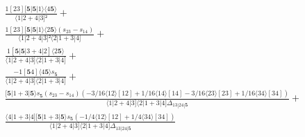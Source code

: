 \documentclass[varwidth, border=5pt]{standalone}
\begin{document}
\begin{my}
$\begin{gathered}
\scriptscriptstyle\frac{1[23][𝟓|𝟓|1⟩⟨4𝟓⟩}{⟨1|2+4|3]²} +\\
\scriptscriptstyle\frac{1[23][𝟓|𝟓|1⟩⟨2𝟓⟩(s_{23}-s_{14})}{⟨1|2+4|3]²⟨2|1+3|4]} +\\
\scriptscriptstyle\frac{1[𝟓|𝟓|3+4|2]⟨2𝟓⟩}{⟨1|2+4|3]⟨2|1+3|4]} +\\
\scriptscriptstyle\frac{-1[𝟓4]⟨4𝟓⟩s_{𝟓}}{⟨1|2+4|3]⟨2|1+3|4]} +\\
\scriptscriptstyle\frac{[𝟓|1+3|𝟓⟩s_{𝟓}(s_{23}-s_{14})(-3/16⟨12⟩[12]+1/16⟨14⟩[14]-3/16⟨23⟩[23]+1/16⟨34⟩[34])}{⟨1|2+4|3]⟨2|1+3|4]Δ_{13|24|𝟓}} +\\
\scriptscriptstyle\frac{⟨4|1+3|4][𝟓|1+3|𝟓⟩s_{𝟓}(-1/4⟨12⟩[12]+1/4⟨34⟩[34])}{⟨1|2+4|3]⟨2|1+3|4]Δ_{13|24|𝟓}} \phantom{+}
\end{gathered}$
\end{my}
\end{document}
